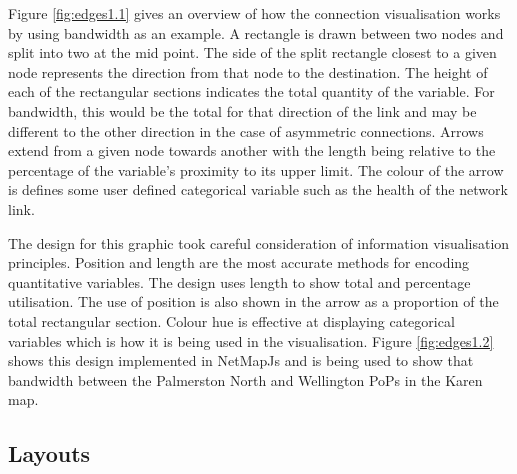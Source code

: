 \documentclass[11pt, a4paper]{article}
\begin{document}
Figure \ref{fig:edges1.1} gives an overview of how the connection visualisation
works by using bandwidth as an example. A rectangle is drawn between two nodes
and split into two at the mid point. The side of the split rectangle closest to
a given node represents the direction from that node to the destination. The
height of each of the rectangular sections indicates the total quantity of the
variable. For bandwidth, this would be the total for that direction of the link
and may be different to the other direction in the case of asymmetric
connections. Arrows extend from a given node towards another with the length
being relative to the percentage of the variable's proximity to its upper limit.
The colour of the arrow is defines some user defined categorical variable such
as the health of the network link.

The design for this graphic took careful consideration of information
visualisation principles. Position and length are the most accurate methods for
encoding quantitative variables.\cite{Spence_2007} The design uses length to
show total and percentage utilisation. The use of position is also shown in the
arrow as a proportion of the total rectangular section. Colour hue is effective
at displaying categorical variables which is how it is being used in the
visualisation. Figure \ref{fig:edges1.2} shows this design implemented in
NetMapJs and is being used to show that bandwidth between the Palmerston North
and Wellington PoPs in the Karen map.


\subsection{Layouts}
\label{sec:layouts}

% 

% 
\end{document}
